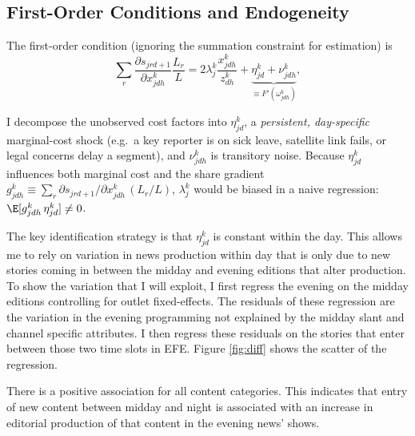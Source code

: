 \documentclass[12pt]{article}
\begin{document}
\subsection*{First-Order Conditions and Endogeneity}

The first-order condition (ignoring the summation constraint for estimation) is
\begin{equation}\label{eq:focs}
	\sum_{r}\frac{\partial s_{jrd+1}}{\partial x_{jdh}^k}\frac{L_r}{L}=	2\lambda_j^k\frac{x_{jdh}^k}{z_{dh}^k} +\underbrace{	\eta_{jd}^k+\nu_{jdh}^k}_{\equiv F'(\omega_{jdh}^k)},
\end{equation}


I decompose the unobserved cost factors into 
$\eta_{jd}^k$, a \emph{persistent, day-specific} marginal-cost shock
(e.g.\ a key reporter is on sick leave, satellite link fails, or legal concerns delay a segment),
and $\nu_{jdh}^k$ is transitory noise. 
Because $\eta_{jd}^k$ influences both marginal cost and the share gradient
$g_{jdh}^k\equiv\sum_{r}\partial s_{jrd+1}/\partial x_{jdh}^k\,(L_r/L)$,
$\lambda_j^k$ would be biased in a naive regression: $\E[g_{jdh}^k\,\eta_{jd}^k]\neq0$.


The key identification strategy is that $\eta_{jd}^k$ is constant within the day. This allows me to rely on variation in news production within day that is only due to new stories coming in between the midday and evening editions that alter production.  To show the variation that I will exploit, I first regress the evening on the midday editions controlling for outlet fixed-effects. The residuals of these regression are the  variation in the evening programming not explained by the midday slant and channel specific attributes. I then regress these residuals on the stories that enter between those two time slots in EFE. Figure \ref{fig:diff} shows the scatter of the regression. 

There is a positive association for all content categories. This indicates that entry of new content between midday and night is associated with an increase in editorial production of that content in the evening news' shows. 
\end{document}
